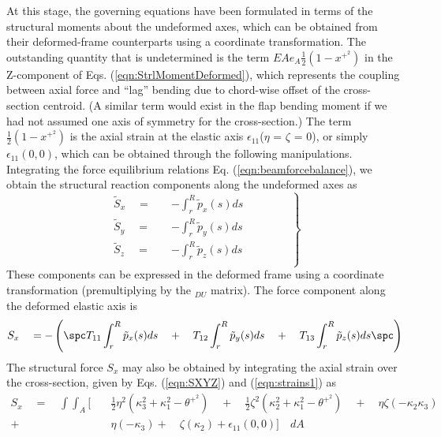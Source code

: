 At this stage, the governing equations have been formulated in terms of the structural moments about the undeformed axes, which can be obtained from their deformed-frame counterparts using a coordinate transformation. The outstanding quantity that is undetermined is the term $EA e_A \frac{1}{2}(1-x^{+^2})$ in the Z-component of Eqs. (\ref{eqn:StrlMomentDeformed}), which represents the coupling between axial force and ``lag'' bending due to chord-wise offset of the cross-section centroid. (A similar term would exist in the flap bending moment if we had not assumed one axis of symmetry for the cross-section.) The term $\frac{1}{2}(1 - x^{+^2})$ is the axial strain at the elastic axis $\epsilon_{11}$($\eta$ = $\zeta$ = 0), or simply $\epsilon_{11}(0,0)$, which can be obtained through the following manipulations. Integrating the force equilibrium relations Eq. (\ref{eqn:beamforcebalance}), we obtain the structural reaction components along the undeformed axes as 
\begin{equation}
\left.
\begin{aligned}
\widetilde{S}_x \quad = \quad & - \int_{r}^{R} \tilde{p}_x(s) ds \\
\widetilde{S}_y \quad = \quad & - \int_{r}^{R} \tilde{p}_y(s) ds \\
\widetilde{S}_z \quad = \quad & - \int_{r}^{R} \tilde{p}_z(s) ds \qquad \qquad \\
\end{aligned} 
\right\}
\end{equation}
These components can be expressed in the deformed frame using a coordinate transformation (premultiplying by the \tee$_{DU}$ matrix). The force component along the deformed elastic axis is 
\begin{equation}
\label{eqn:SXext}
S_x \quad = -\left(\spc T_{11} \int_{r}^{R} \tilde{p}_x(s) ds \quad + \quad  T_{12} \int_{r}^{R} \tilde{p}_y(s) ds \quad + \quad T_{13} \int_{r}^{R} \tilde{p}_z(s) ds \spc \right)
\end{equation}
The structural force $S_x$ may also be obtained by integrating the axial strain over the cross-section, given by Eqs. (\ref{eqn:SXYZ}) and (\ref{eqn:strains1}) as
\begin{equation*}
\begin{aligned}
S_x \quad = \quad \int \int_{A} [\quad & \frac{1}{2}\eta^2(\kappa_3^2 + \kappa_1^2 - \theta^{+^2}) \quad + \quad \frac{1}{2}\zeta^2 (\kappa_2^2 + \kappa_1^2 - \theta^{+^2}) \quad + \quad \eta \zeta (-\kappa_2 \kappa_3) \\
+ \qquad & \eta (-\kappa_3) + \quad \zeta (\kappa_2) + \epsilon_{11}(0,0) ] \quad dA 
\end{aligned}
\end{equation*}

